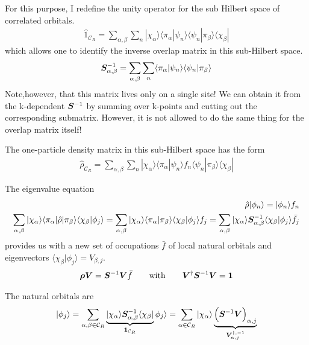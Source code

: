 \documentclass[11pt,a4paper]{report}
\begin{document}
For this purpose, I redefine the unity operator for the sub Hilbert
space of correlated orbitals.
\begin{eqnarray}
\hat{1}_{\mathcal{C}_R}
=\sum_{\alpha,\beta}\sum_n
|\chi_\alpha\rangle
\langle\pi_\alpha|\psi_n\rangle\langle\psi_n|\pi_\beta\rangle
\langle\chi_\beta|
\end{eqnarray}
which allows one to identify the inverse overlap matrix in this sub-Hilbert space.
\begin{eqnarray}
\bm{S}^{-1}_{\alpha,\beta}
=\sum_{\alpha,\beta}\sum_n
\langle\pi_\alpha|\psi_n\rangle\langle\psi_n|\pi_\beta\rangle
\end{eqnarray}
Note,however, that this matrix lives only on a single site! We can
obtain it from the k-dependent $\bm{S}^{-1}$ by summing over k-points
and cutting out the corresponding submatrix. However, it is not
allowed to do the same thing for the overlap matrix itself!

The one-particle density matrix in this sub-Hilbert space has the form
\begin{eqnarray}
\hat{\rho}_{\mathcal{C}_R}
=\sum_{\alpha,\beta}\sum_n
|\chi_\alpha\rangle
\langle\pi_\alpha|\psi_n\rangle f_n \langle\psi_n|\pi_\beta\rangle
\langle\chi_\beta|
\end{eqnarray}

The eigenvalue equation
\begin{eqnarray}
\hat{\rho}|\phi_n\rangle=|\phi_n\rangle f_n
\nonumber\\
\sum_{\alpha,\beta}|\chi_\alpha\rangle
\langle\pi_\alpha|\hat{\rho}|\pi_\beta\rangle\langle\chi_\beta|\phi_j\rangle
=\sum_{\alpha,\beta}|\chi_\alpha\rangle\langle\pi_\alpha|\pi_\beta\rangle
\langle\chi_\beta|\phi_j\rangle f_j
=\sum_{\alpha,\beta}|\chi_\alpha\rangle
\bm{S}^{-1}_{\alpha,\beta}\langle\chi_\beta|\phi_j\rangle \bar{f}_j
\end{eqnarray}
provides us with a new set of occupations $\bar{f}$ of local natural
orbitals and eigenvectors
$\langle\chi_\beta|\phi_j\rangle=V_{\beta,j}$.
\begin{eqnarray}
\bm{\rho}\bm{V}=\bm{S}^{-1}\bm{V}\bar{f}
\qquad\text{with}\qquad
\bm{V}^\dagger\bm{S}^{-1}\bm{V}=\bm{1}
\end{eqnarray}

The natural orbitals are
\begin{eqnarray}
|\phi_j\rangle=\sum_{\alpha,\beta\in\mathcal{C}_R}
\underbrace{|\chi_\alpha\rangle
\bm{S}^{-1}_{\alpha,\beta}\langle\chi_\beta|}_{\bm{1}_{\mathcal{C}_R}}
\phi_j\rangle
=\sum_{\alpha\in\mathcal{C}_R}|\chi_\alpha\rangle
\underbrace{\Bigl(\bm{S}^{-1}\bm{V}\Bigr)_{\alpha,j}}_{\bm{V}^{\dagger,-1}_{\alpha,j}}
\end{eqnarray}
\end{document}
